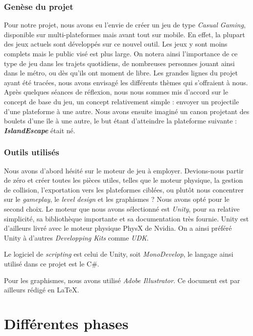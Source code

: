 \documentclass[12pt,a4paper]{report}
\begin{document}
\section{Genèse du projet}
Pour notre projet, nous avons eu l'envie de créer un jeu de type \textit{Casual Gaming}, disponible sur multi-plateformes mais avant tout sur mobile. En effet, la plupart des jeux actuels sont développés sur ce nouvel outil. Les jeux y sont moins complets mais le public visé est plus large. On notera ainsi l'importance de ce type de jeu dans les trajets quotidiens, de nombreuses personnes jouant ainsi dans le métro, ou dès qu'ils ont moment de libre. Les grandes lignes du projet ayant été tracées, nous avons envisagé les différents thèmes qui s'offraient à nous.  Après quelques séances de réflexion, nous nous sommes mis d’accord sur le concept de base du jeu, un concept relativement simple : envoyer un projectile d’une plateforme à une autre. Nous avons ensuite imaginé un canon projetant des boulets d’une île à une autre, le but étant d’atteindre la plateforme suivante : \textit{\textbf{IslandEscape}} était né.\newline

\section{Outils utilisés}
Nous avons d'abord hésité sur le moteur de jeu à employer. Devions-nous partir de zéro et créer toutes les pièces utiles, telles que le moteur physique, la gestion de collision, l'exportation vers les plateformes ciblées, ou plutôt nous concentrer sur le \textit{gameplay}, le \textit{level design} et les graphismes ? Nous avons opté pour le second choix. Le moteur que nous avons sélectionné est \textit{Unity}, pour sa relative simplicité, sa bibliothèque importante et sa documentation très fournie. Unity est d'ailleurs livré avec le moteur physique PhysX\textregistered{} de Nvidia. On a ainsi préféré Unity à d'autres \textit{Developping Kits} comme \textit{UDK}. \newline

Le logiciel de \textit{scripting} est celui de Unity, soit \textit{MonoDevelop}, le langage ainsi utilisé dans ce projet est le C\#. \newline

Pour les graphismes, nous avons utilisé \textit{Adobe Illustrator}. Ce document est par ailleurs rédigé en \LaTeX.

\part{Différentes phases}
\end{document}
